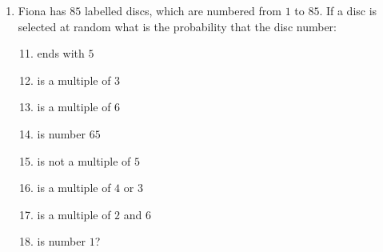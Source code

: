 \begin{exercises}{}
{\begin{enumerate}[itemsep=6pt, label=\textbf{\arabic*}. ]
\begin{center}
\begin{tabular}{|l|c|c|c|}
      \end{tabular}
    \end{center}
    If a pupil is selected at random what is the probability that the
    pupil will be:
    \begin{enumerate}[noitemsep, label=\textbf{(\alph*)} ]
    \item a female
    \item a $4$ year old male
    \item aged $3$ or $4$
    \item aged $3$ and $4$
    \item not $5$
    \item either $3$ or female?
    \end{enumerate}
  \item Fiona has $85$ labelled discs, which are numbered from $1$ to
    $85$. If a disc is selected at random what is the probability that
    the disc number:
    \begin{enumerate}[noitemsep, label=\textbf{(\alph*)} ]
    \setcounter{enumi}{10}
    \item ends with $5$
    \item is a multiple of $3$
    \item is a multiple of $6$
    \item is number $65$
    \item is not a multiple of $5$
    \item is a multiple of $4$ or $3$
    \item is a multiple of $2$ and $6$
    \item is number $1$?
    \end{enumerate}

 \end{enumerate}

}
\end{exercises}


